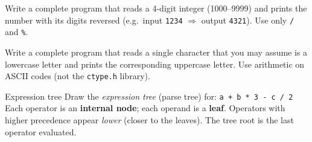 \documentclass[11pt]{article}
\begin{document}
\begin{writecode}
Write a complete program that reads a 4-digit integer (1000--9999) and prints the
number with its digits reversed (e.g.\ input \texttt{1234} $\Rightarrow$ output \texttt{4321}).
Use only \texttt{/} and \texttt{\%}.
\end{writecode}

\begin{writecode}
Write a complete program that reads a single character that you may assume is a
lowercase letter and prints the corresponding uppercase letter. Use arithmetic on
ASCII codes (not the \texttt{ctype.h} library).
\end{writecode}

\begin{drawex}{Expression tree}
Draw the \emph{expression tree} (parse tree) for: \quad\texttt{a + b * 3 - c / 2}\\[4pt]
Each operator is an \textbf{internal node}; each operand is a \textbf{leaf}.
Operators with higher precedence appear \emph{lower} (closer to the leaves).
The tree root is the last operator evaluated.
\end{drawex}
\end{document}
